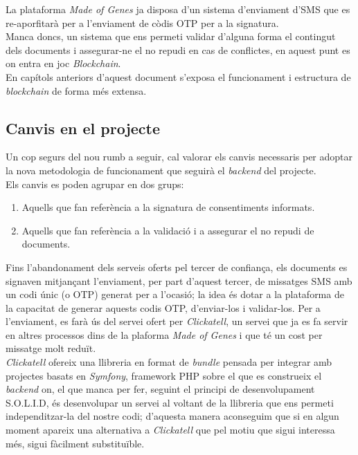 La plataforma \textit{Made of Genes} ja disposa d'un sistema d'enviament d'SMS que es re-aporfitarà per a l'enviament de còdis OTP per a la signatura.\\
\newline Manca doncs, un sistema que ens permeti validar d'alguna forma el contingut dels documents i assegurar-ne el no repudi en cas de conflictes, en aquest punt es on entra en joc \textit{Blockchain}.\\
\newline En capítols anteriors d'aquest document s'exposa el funcionament i estructura de \textit{blockchain} de forma més extensa.
\subsection{Canvis en el projecte}
Un cop segurs del nou rumb a seguir, cal valorar els canvis necessaris per adoptar la nova metodologia de funcionament que seguirà el \textit{backend} del projecte.\\
Els canvis es poden agrupar en dos grups:
\begin{enumerate}
    \item Aquells que fan referència a la signatura de consentiments informats.
    \item Aquells que fan referència a la validació i a assegurar el no repudi de documents.
\end{enumerate}
Fins l'abandonament dels serveis oferts pel tercer de confiança, els documents es signaven mitjançant l'enviament, per part d'aquest tercer, de missatges SMS amb un codi únic (o OTP) generat per a l'ocasió; la idea és dotar a la plataforma de la capacitat de generar aquests codis OTP, d'enviar-los i validar-los.
Per a l'enviament, es farà ús del servei ofert per \textit{Clickatell}, un servei que ja es fa servir en altres processos dins de la plaforma \textit{Made of Genes} i que té un cost per missatge molt reduït.\\
\newline \textit{Clickatell} ofereix una llibreria en format de \textit{bundle} pensada per integrar amb projectes basats en \textit{Symfony}, framework PHP sobre el que es construeix el \textit{backend} on, el que manca per fer, seguint el principi de desenvolupament S.O.L.I.D, és desenvolupar un servei al voltant de la llibreria que ens permeti independitzar-la del nostre codi; d'aquesta manera aconseguim que si en algun moment apareix una alternativa a \textit{Clickatell} que pel motiu que sigui interessa més, sigui fàcilment substituïble.\\
